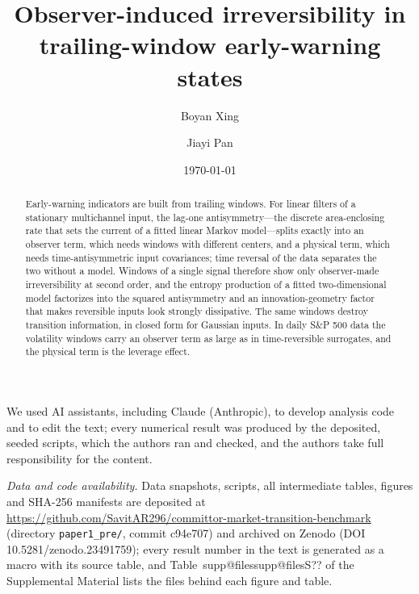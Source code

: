 \documentclass[pre,twocolumn,superscriptaddress,nofootinbib]{revtex4-2}
\makeatletter
\newcommand{\Sref}[1]{\ifcsname supp@#1\endcsname\csname supp@#1\endcsname\else S??\fi}
\newcommand{\ZenodoDOI}{10.5281/zenodo.23491759}
\newcommand{\RepoCommit}{c94e707}
\makeatother
\begin{document}
\title{Observer-induced irreversibility in trailing-window early-warning states}

\author{Boyan Xing}
\author{Jiayi Pan}

\date{\today}

\begin{abstract}
Early-warning indicators are built from trailing windows. For linear filters of a stationary multichannel input, the lag-one antisymmetry---the discrete area-enclosing rate that sets the current of a fitted linear Markov model---splits exactly into an observer term, which needs windows with different centers, and a physical term, which needs time-antisymmetric input covariances; time reversal of the data separates the two without a model. Windows of a single signal therefore show only observer-made irreversibility at second order, and the entropy production of a fitted two-dimensional model factorizes into the squared antisymmetry and an innovation-geometry factor that makes reversible inputs look strongly dissipative. The same windows destroy transition information, in closed form for Gaussian inputs. In daily S\&P 500 data the volatility windows carry an observer term as large as in time-reversible surrogates, and the physical term is the leverage effect.
\end{abstract}

\maketitle








\begin{acknowledgments}
We used AI assistants, including Claude (Anthropic), to develop analysis code and to edit the text; every numerical result was produced by the deposited, seeded scripts, which the authors ran and checked, and the authors take full responsibility for the content.
\end{acknowledgments}

\emph{Data and code availability.} Data snapshots, scripts, all intermediate tables, figures and SHA-256 manifests are deposited at \url{https://github.com/SavitAR296/committor-market-transition-benchmark} (directory \nolinkurl{paper1_pre/}, commit \RepoCommit) and archived on Zenodo (DOI \ZenodoDOI); every result number in the text is generated as a macro with its source table, and Table~\Sref{files} of the Supplemental Material \cite{SM} lists the files behind each figure and table.




\end{document}

